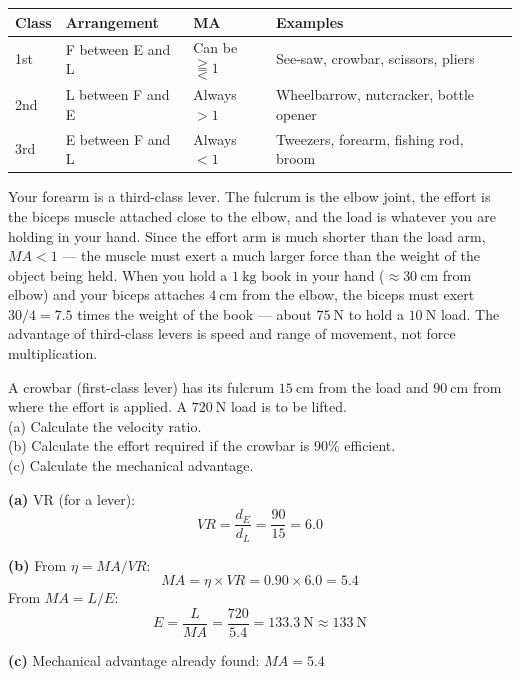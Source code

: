 \begin{defbox}
\begin{center}
\begin{tabular}{lllll}
\toprule
\textbf{Class} & \textbf{Arrangement} & \textbf{MA} &
\textbf{Examples}\\
\midrule
1st & F between E and L & Can be  $\gtreqqless 1$ & See-saw, crowbar, scissors, pliers\\
2nd & L between F and E & Always $>1$ &
Wheelbarrow, nutcracker, bottle opener\\
3rd & E between F and L & Always $<1$ &
Tweezers, forearm, fishing rod, broom\\
\bottomrule
\end{tabular}
\end{center}
\end{defbox}

\begin{realworldbox}
Your forearm is a third-class lever. The fulcrum is
the elbow joint, the effort is the biceps muscle
attached close to the elbow, and the load is whatever
you are holding in your hand. Since the effort arm
is much shorter than the load arm, $MA < 1$ --- the
muscle must exert a much larger force than the weight
of the object being held. When you hold a $1\ \text{kg}$
book in your hand ($\approx 30\ \text{cm}$ from elbow)
and your biceps attaches $4\ \text{cm}$ from the elbow,
the biceps must exert $30/4 = 7.5$ times the weight
of the book --- about $75\ \text{N}$ to hold a $10\ \text{N}$
load. The advantage of third-class levers is speed
and range of movement, not force multiplication.
\end{realworldbox}

\begin{examplebox}[10.2]
A crowbar (first-class lever) has its fulcrum
$15\ \text{cm}$ from the load and $90\ \text{cm}$
from where the effort is applied. A $720\ \text{N}$
load is to be lifted.\\
(a) Calculate the velocity ratio.\\
(b) Calculate the effort required if the crowbar
is 90\% efficient.\\
(c) Calculate the mechanical advantage.
\end{examplebox}

\begin{solutionbox}
\textbf{(a)} VR (for a lever):
\[
  VR = \frac{d_E}{d_L} = \frac{90}{15} = 6.0
\]

\textbf{(b)} From $\eta = MA/VR$:
\[
  MA = \eta \times VR = 0.90 \times 6.0 = 5.4
\]
From $MA = L/E$:
\[
  E = \frac{L}{MA} = \frac{720}{5.4}
  = 133.3\ \text{N} \approx 133\ \text{N}
\]

\textbf{(c)} Mechanical advantage already found:
$MA = 5.4$
\end{solutionbox}


